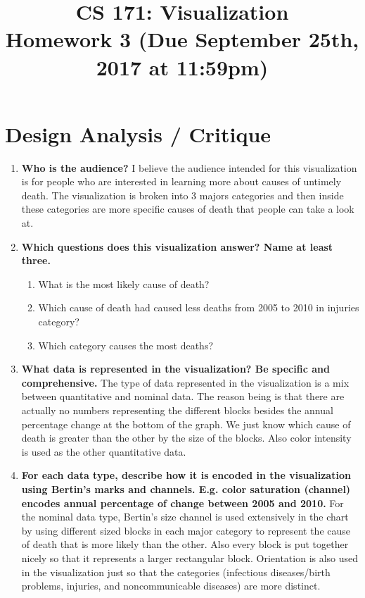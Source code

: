 \documentclass[11pt]{article}
\begin{document}
\title{
  CS 171: Visualization \\
  \Large{Homework 3 (Due September 25th, 2017 at 11:59pm)}
}
\date{}

\maketitle

\vspace{-1cm}


\section*{Design Analysis / Critique}

\begin{enumerate}
  \item \textbf{Who is the audience?} \newline
  	I believe the audience intended for this visualization is for people who are interested in learning more about causes of untimely death. The visualization is broken into 3 majors categories and then inside these categories are more specific causes of death that people can take a look at.
	
  \item \textbf{Which questions does this visualization answer? Name at least three.}
  \begin{enumerate}
    \item What is the most likely cause of death?
    \item Which cause of death had caused less deaths from 2005 to 2010 in injuries category?
    \item Which category causes the most deaths?
  \end{enumerate}
  
  \item \textbf{What data is represented in the visualization? Be specific and comprehensive.} \newline
  The type of data represented in the visualization is a mix between quantitative and nominal data. The reason being is that there are actually no numbers representing the different blocks besides the annual percentage change at the bottom of the graph. We just know which cause of death is greater than the other by the size of the blocks. Also color intensity is used as the other quantitative data.
  
  \item \textbf{For each data type, describe how it is encoded in the visualization using Bertin's marks and channels. E.g.
color saturation (channel) encodes annual percentage of change between 2005 and 2010.} \newline
  For the nominal data type, Bertin's size channel is used extensively in the chart by using different sized blocks in each major category to represent the cause of death that is more likely than the other. Also every block is put together nicely so that it represents a larger rectangular block. Orientation is also used in the visualization just so that the categories (infectious diseases/birth problems, injuries, and noncommunicable diseases) are more distinct.
  

\end{enumerate}
\end{document}

